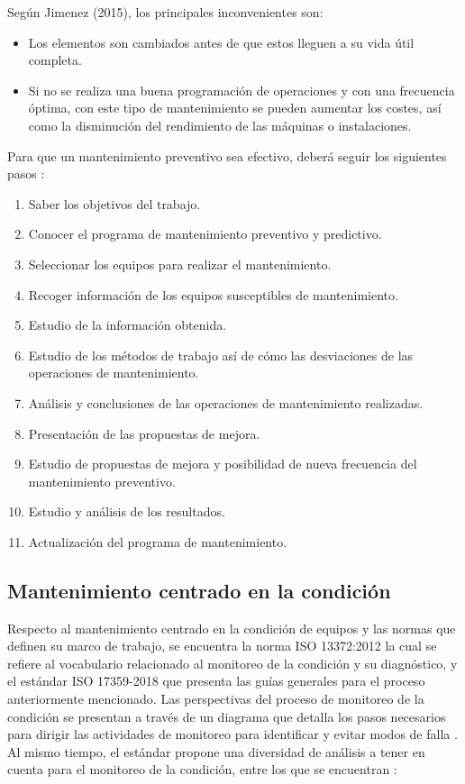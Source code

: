 Según Jimenez (2015), los principales inconvenientes son:

\begin{itemize}
\item Los elementos son cambiados antes de que estos lleguen a su vida útil completa.
\item Si no se realiza una buena programación de operaciones y con una frecuencia óptima, con este tipo de mantenimiento se pueden aumentar los costes, así como la disminución del rendimiento de las máquinas o instalaciones.
\end{itemize}

Para que un mantenimiento preventivo sea efectivo, deberá seguir los siguientes pasos \citep{jimenez2015}:

\begin{enumerate}
\item Saber los objetivos del trabajo.
\item Conocer el programa de mantenimiento preventivo y predictivo.
\item Seleccionar los equipos para realizar el mantenimiento.
\item Recoger información de los equipos susceptibles de mantenimiento.
\item Estudio de la información obtenida.
\item Estudio de los métodos de trabajo así de cómo las desviaciones de las operaciones de mantenimiento.
\item Análisis y conclusiones de las operaciones de mantenimiento realizadas.
\item Presentación de las propuestas de mejora.
\item Estudio de propuestas de mejora y posibilidad de nueva frecuencia del mantenimiento preventivo.
\item Estudio y análisis de los resultados.
\item Actualización del programa de mantenimiento.
\end{enumerate}



\subsection{Mantenimiento centrado en la condición}


Respecto al mantenimiento centrado en la condición de equipos y las normas que definen su marco de trabajo, se encuentra la norma ISO 13372:2012 la cual se refiere al vocabulario relacionado al monitoreo de la condición y su diagnóstico, y el estándar ISO 17359-2018 que presenta las guías generales para el proceso anteriormente mencionado.
Las perspectivas del proceso de monitoreo de la condición se presentan a través de un diagrama que detalla los pasos necesarios para dirigir las actividades de monitoreo para identificar y evitar modos de falla \citep{iso2018}. 
Al mismo tiempo, el estándar propone una diversidad de análisis a tener en cuenta para el monitoreo de la condición, entre los que se encuentran \citep{iso2018}:

